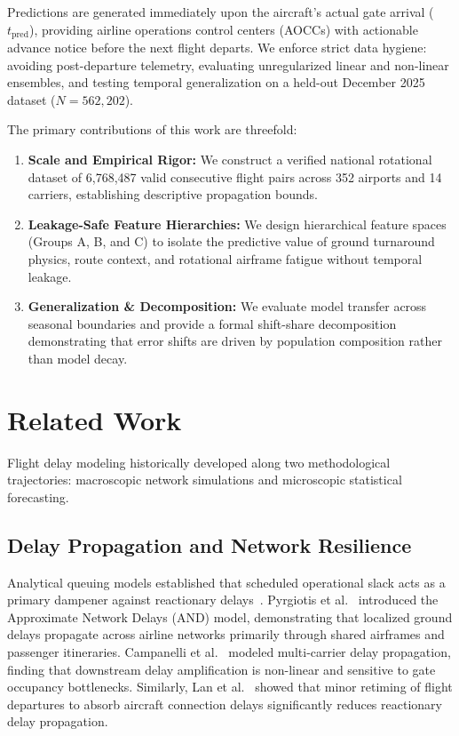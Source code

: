 \documentclass[conference]{IEEEtran}
\begin{document}
Predictions are generated immediately upon the aircraft's actual gate arrival ($t_{\text{pred}}$), providing airline operations control centers (AOCCs) with actionable advance notice before the next flight departs. We enforce strict data hygiene: avoiding post-departure telemetry, evaluating unregularized linear and non-linear ensembles, and testing temporal generalization on a held-out December 2025 dataset ($N = 562,202$).

The primary contributions of this work are threefold:
\begin{enumerate}
    \item \textbf{Scale and Empirical Rigor:} We construct a verified national rotational dataset of 6,768,487 valid consecutive flight pairs across 352 airports and 14 carriers, establishing descriptive propagation bounds.
    \item \textbf{Leakage-Safe Feature Hierarchies:} We design hierarchical feature spaces (Groups A, B, and C) to isolate the predictive value of ground turnaround physics, route context, and rotational airframe fatigue without temporal leakage.
    \item \textbf{Generalization \& Decomposition:} We evaluate model transfer across seasonal boundaries and provide a formal shift-share decomposition demonstrating that error shifts are driven by population composition rather than model decay.
\end{enumerate}

\section{Related Work}
Flight delay modeling historically developed along two methodological trajectories: macroscopic network simulations and microscopic statistical forecasting.

\subsection{Delay Propagation and Network Resilience}
Analytical queuing models established that scheduled operational slack acts as a primary dampener against reactionary delays~\cite{ahmadbeygi2010analysis}. Pyrgiotis et al.~\cite{pyrgiotis2013modelling} introduced the Approximate Network Delays (AND) model, demonstrating that localized ground delays propagate across airline networks primarily through shared airframes and passenger itineraries. Campanelli et al.~\cite{campanelli2016modeling} modeled multi-carrier delay propagation, finding that downstream delay amplification is non-linear and sensitive to gate occupancy bottlenecks. Similarly, Lan et al.~\cite{lan2006planning} showed that minor retiming of flight departures to absorb aircraft connection delays significantly reduces reactionary delay propagation.
\end{document}
